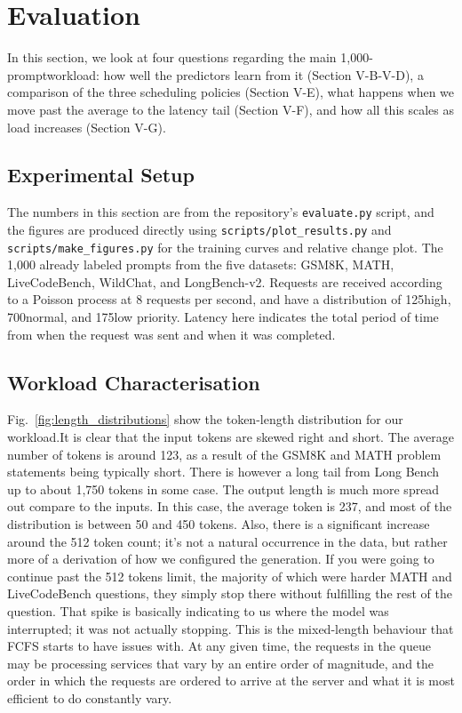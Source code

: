 \documentclass[conference]{IEEEtran}
\begin{document}
\section{Evaluation}
\label{sec:evaluation}
In this section, we look at four questions regarding the main 1,000-promptworkload: how well the predictors learn from it (Section V-B-V-D), a comparison of the three scheduling policies (Section V-E), what happens when we move past the average to the latency tail (Section V-F), and how all this scales as load increases (Section V-G). 


\subsection{Experimental Setup}
\label{sec:experimental}
The numbers in this section are from the repository's \texttt{evaluate.py} script, and the figures are produced directly using \texttt{scripts/plot\_results.py} and \texttt{scripts/make\_figures.py} for the training curves and relative change plot. The 1,000 already labeled prompts from the five datasets: GSM8K, MATH, LiveCodeBench, WildChat, and LongBench-v2. Requests are received according to a Poisson process at 8 requests per second, and have a distribution of 125high, 700normal, and 175low priority. Latency here indicates the total period of time from when the request was sent and when it was completed.  

\subsection{Workload Characterisation}
\label{sec:workload}
Fig.~\ref{fig:length_distributions} show the token-length distribution for our workload.It is clear that the input tokens are skewed right and short. The average number of tokens is around 123, as a result of the GSM8K and MATH problem statements being typically short. There is however a long tail from Long Bench up to about 1,750 tokens in some case. The output length is much more spread out compare to the inputs. In this case, the average token is 237, and most of the distribution is between 50 and 450 tokens. Also, there is a significant increase around the 512 token count; it's not a natural occurrence in the data, but rather more of a derivation of how we configured the generation. If you were going to continue past the 512 tokens limit, the majority of which were harder MATH and LiveCodeBench questions, they simply stop there without fulfilling the rest of the question. That spike is basically indicating to us where the model was interrupted; it was not actually stopping. This is the mixed-length behaviour that FCFS starts to have issues with. At any given time, the requests in the queue may be processing services that vary by an entire order of magnitude, and the order in which the requests are ordered to arrive at the server and what it is most efficient to do constantly vary.
\end{document}
